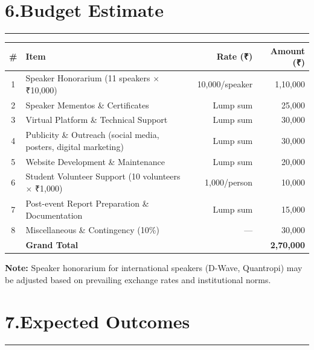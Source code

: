 \documentclass[12pt,a4paper]{article}
\begin{document}
\section*{6.\quad Budget Estimate}
\vspace{-4pt}\hrule\vspace{6pt}

\begin{table}[h!]
\centering
\begin{tabularx}{\textwidth}{c X r r}
  \toprule
  \textbf{\#} & \textbf{Item} & \textbf{Rate (\textrm{₹})} & \textbf{Amount (\textrm{₹})} \\
  \midrule
  1 & Speaker Honorarium (11 speakers $\times$ \textrm{₹}10,000) & 10,000/speaker & 1,10,000 \\
  2 & Speaker Mementos \& Certificates & Lump sum & 25,000 \\
  3 & Virtual Platform \& Technical Support & Lump sum & 30,000 \\
  4 & Publicity \& Outreach (social media, posters, digital marketing) & Lump sum & 30,000 \\
  5 & Website Development \& Maintenance & Lump sum & 20,000 \\
  6 & Student Volunteer Support (10 volunteers $\times$ \textrm{₹}1,000) & 1,000/person & 10,000 \\
  7 & Post-event Report Preparation \& Documentation & Lump sum & 15,000 \\
  8 & Miscellaneous \& Contingency (10\%) & --- & 30,000 \\
  \midrule
  & \textbf{Grand Total} & & \textbf{2,70,000} \\
  \bottomrule
\end{tabularx}
\end{table}

\textbf{Note:} Speaker honorarium for international speakers (D-Wave, Quantropi) may be adjusted based on prevailing exchange rates and institutional norms.

\section*{7.\quad Expected Outcomes}
\vspace{-4pt}\hrule\vspace{6pt}
\end{document}
